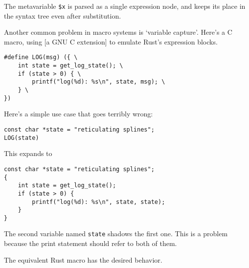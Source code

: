 \documentclass[a4paper,]{book}
\newenvironment{Shaded}{\begin{snugshade}}{\end{snugshade}}
\newcommand{\KeywordTok}[1]{\textcolor[rgb]{0.13,0.29,0.53}{\textbf{{#1}}}}
\newcommand{\DecValTok}[1]{\textcolor[rgb]{0.00,0.00,0.81}{{#1}}}
\newcommand{\StringTok}[1]{\textcolor[rgb]{0.31,0.60,0.02}{{#1}}}
\newcommand{\OtherTok}[1]{\textcolor[rgb]{0.56,0.35,0.01}{{#1}}}
\newcommand{\NormalTok}[1]{{#1}}
\begin{document}
\begin{Shaded}
\end{Shaded}

The metavariable \texttt{\$x} is parsed as a single expression node, and
keeps its place in the syntax tree even after substitution.

Another common problem in macro systems is `variable capture'. Here's a
C macro, using {[}a GNU C extension{]} to emulate Rust's expression
blocks.

\begin{verbatim}
#define LOG(msg) ({ \
    int state = get_log_state(); \
    if (state > 0) { \
        printf("log(%d): %s\n", state, msg); \
    } \
})
\end{verbatim}

Here's a simple use case that goes terribly wrong:

\begin{verbatim}
const char *state = "reticulating splines";
LOG(state)
\end{verbatim}

This expands to

\begin{verbatim}
const char *state = "reticulating splines";
{
    int state = get_log_state();
    if (state > 0) {
        printf("log(%d): %s\n", state, state);
    }
}
\end{verbatim}

The second variable named \texttt{state} shadows the first one. This is
a problem because the print statement should refer to both of them.

The equivalent Rust macro has the desired behavior.

\begin{Shaded}
\end{Shaded}
\end{document}
